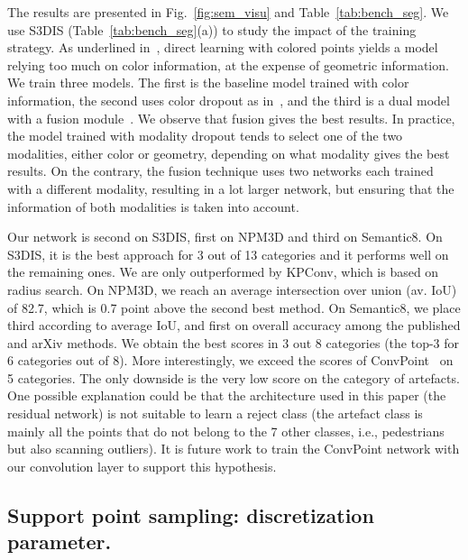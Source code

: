 The results are presented in Fig.~\ref{fig:sem_visu} and Table~\ref{tab:bench_seg}.
We use S3DIS (Table~\ref{tab:bench_seg}(a)) to study the impact of the training strategy.
As underlined in~\cite{thomas2019kpconv,boulch2020convpoint}, direct learning with colored points yields a model relying too much on color information, at the expense of geometric information.
We train three models.
The first is the baseline model trained with color information, the second uses color dropout as in~\cite{thomas2019kpconv}, and the third is a dual model with a fusion module~\cite{boulch2020convpoint}.
We observe that fusion gives the best results.
In practice, the model trained with modality dropout tends to select one of the two modalities, either color or geometry, depending on what modality gives the best results.
On the contrary, the fusion technique uses two networks each trained with a different modality, resulting in a lot larger network, but ensuring that the information of both modalities is taken into account.

Our network is second on S3DIS, first on NPM3D and third on Semantic8.
On S3DIS, it is the best approach for 3 out of 13 categories and it performs well on the remaining ones.
We are only outperformed by KPConv, which is based on radius search.
On NPM3D, we reach an average intersection over union (av. IoU) of 82.7, which is 0.7 point above the second best method.
On Semantic8, we place third according to average IoU, and first on overall accuracy among the published and arXiv methods. We obtain the best scores in 3 out 8 categories (the top-3 for 6 categories out of 8). More interestingly, we exceed the scores of ConvPoint~\cite{boulch2020convpoint} on 5 categories.
The only downside is the very low score on the category of artefacts.
One possible explanation could be that the architecture used in this paper (the residual network) is not suitable to learn a reject class (the artefact class is mainly all the points that do not belong to the 7 other classes, i.e., pedestrians but also scanning outliers).
It is future work to train the ConvPoint network with our convolution layer to support this hypothesis.

    

\subsection{Support point sampling: discretization parameter.}
\label{subsubsec:expe_support}

